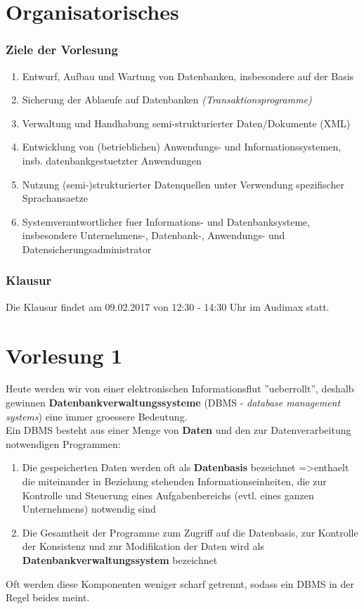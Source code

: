 \documentclass[a4paper,10pt]{article}
\begin{document}
\kopf
\renewcommand{\figurename}{Figure}

\tableofcontents

\part{Organisatorisches}

\section{Ziele der Vorlesung}
\begin{enumerate}
\item Entwurf, Aufbau und Wartung von Datenbanken, insbesondere auf der Basis
\item Sicherung der Ablaeufe auf Datenbanken \emph{(Transaktionsprogramme)}
\item Verwaltung und Handhabung semi-strukturierter Daten/Dokumente (XML)
\item Entwicklung von (betrieblichen) Anwendungs- und Informationssystemen, insb. datenbankgestuetzter Anwendungen
\item Nutzung (semi-)strukturierter Datenquellen unter Verwendung spezifischer Sprachansaetze
\item Systemverantwortlicher fuer Informations- und Datenbanksysteme, insbesondere Unternehmens-, Datenbank-, Anwendungs- und Datensicherungsadministrator
\end{enumerate}

\section{Klausur}
Die Klausur findet am 09.02.2017 von 12:30 - 14:30 Uhr im Audimax statt.

\newpage
\part{Vorlesung 1}
Heute werden wir von einer elektronischen Informationsflut ''ueberrollt'', deshalb gewinnen \textbf{Datenbankverwaltungssysteme} (DBMS - \emph{database management systems}) eine immer groessere Bedeutung.\\
Ein DBMS besteht aus einer Menge von \textbf{Daten} und den zur Datenverarbeitung notwendigen Programmen:
\begin{enumerate}
\item Die gespeicherten Daten werden oft als \textbf{Datenbasis} bezeichnet =\textgreater enthaelt die miteinander in Beziehung stehenden Informationseinheiten, die zur Kontrolle und Steuerung eines Aufgabenbereichs (evtl. eines ganzen Unternehmens) notwendig sind
\item Die Gesamtheit der Programme zum Zugriff auf die Datenbasis, zur Kontrolle der Konsistenz und zur Modifikation der Daten wird als \textbf{Datenbankverwaltungssystem} bezeichnet
\end{enumerate}
Oft werden diese Komponenten weniger scharf getrennt, sodass ein DBMS in der Regel beides meint.
\end{document}
